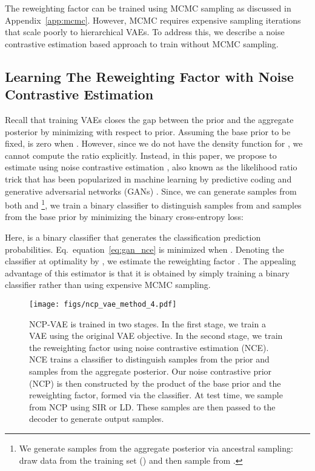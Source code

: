 \documentclass{article} \usepackage{iclr2021_conference,times}
\def\eqref#1{equation~\ref{#1}}
\begin{document}
The reweighting factor  can be trained using MCMC sampling as discussed in Appendix~\ref{app:mcmc}. However, MCMC requires expensive sampling iterations that scale poorly to hierarchical VAEs. To address this, we describe a noise contrastive estimation based approach to train  without MCMC sampling.

\subsection{Learning The Reweighting Factor with Noise Contrastive Estimation}
Recall that training VAEs closes the gap between the prior and the aggregate posterior by minimizing  with respect to prior. Assuming the base prior  to be fixed,  is zero when . However, since we do not have the density function for , we cannot compute the ratio explicitly. 
Instead, in this paper, we propose to estimate  using noise contrastive estimation \citep{gutmann2010nce}, also known as the likelihood ratio trick that has been popularized in  machine learning  by predictive coding \citep{oord2018cpc} and generative adversarial networks (GANs) \citep{goodfellow_generative_2014}. Since, we can generate samples from both  and \footnote{We  generate samples from the aggregate posterior  via ancestral sampling: draw data from the training set () and then sample from .}, we train a binary classifier to distinguish samples from  and samples from the base prior  by minimizing the binary cross-entropy loss:

Here,  is a binary classifier that generates the classification prediction probabilities. 
Eq.~\eqref{eq:gan_nce} is minimized when . Denoting the classifier at optimality by , we estimate the reweighting factor  . The appealing advantage of this estimator is that it is obtained by simply training a  binary classifier rather than using expensive MCMC sampling. 

\begin{figure*}[t]
\centering
\vspace{-0.2cm}
\texttt{[image: figs/ncp\_vae\_method\_4.pdf]}
\caption{NCP-VAE is trained in two stages. In the first stage, we train a VAE using the original VAE objective. In the second stage, we train the reweighting factor  using noise contrastive estimation (NCE). NCE trains a classifier to distinguish samples from the prior and samples from the aggregate posterior. Our noise contrastive prior (NCP) is then constructed by the product of the base prior and the reweighting factor, formed via the classifier. At test time, we sample from NCP using SIR or LD. These samples are then passed to the decoder to generate output samples. }
\label{fig:training}
\end{figure*}
\end{document}
